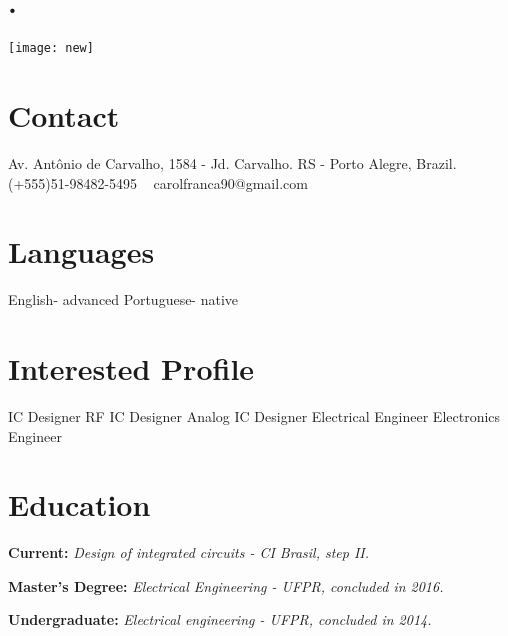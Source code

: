\documentclass[]{cv-style}          %
\begin{document}
\lastupdated


\begin{aside}
	\section{.}
	\texttt{[image: new]}
	\flushleft%
	\section{Contact}
	Av. Antônio de Carvalho,
	1584 - Jd. Carvalho.
	RS - Porto Alegre, Brazil.
	~
	(+555)51-98482-5495
	~
	carolfranca90@gmail.com
	\section{Languages}
	English- advanced
	Portuguese- native
	\section{Interested Profile}
	IC Designer
	RF IC Designer
	Analog IC  Designer
	Electrical Engineer
	Electronics Engineer
\end{aside}


\section{Education}
\vspace{-0.2cm}

\textbf{Current:}\textit{ Design of integrated circuits - CI Brasil, step II.}

\textbf{Master's Degree:}\textit{ Electrical Engineering - UFPR, concluded in 2016.}

\textbf{Undergraduate: }\textit{ Electrical engineering - UFPR, concluded in 2014.}



\end{document}
